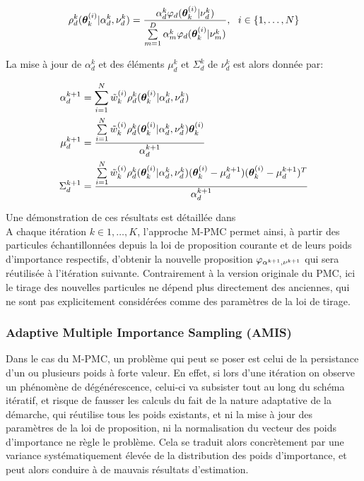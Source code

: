 \begin{equation}
	\rho_d^k({\bm{\theta}}_k^{(i)} | \alpha_d^k , \nu_d^k) = \dfrac{\alpha_d^k \varphi_d({\bm{\theta}}_k^{(i)} | \nu_d^k)}{\sum\limits_{m=1}^D\alpha_m^k \varphi_d({\bm{\theta}}_k^{(i)} | \nu_m^k)}, ~~ i \in \{1, \dots, N\}
\end{equation}

La mise à jour de $\alpha_d^k$ et des éléments $\mu_d^k$ et $\Sigma_d^k$ de $\nu_d^k$ est alors donnée par:

\begin{equation}
\begin{split}
\alpha_d^{k+1}  &= \sum\limits_{i=1}^N \tilde{w}_k^{(i)} \rho_d^k({\bm{\theta}}_k^{(i)} | \alpha_d^k , \nu_d^k) \\
\mu_d^{k+1} &= \dfrac{\sum\limits_{i=1}^N\tilde{w}_k^{(i)} \rho_d^k({\bm{\theta}}_k^{(i)} | \alpha_d^k , \nu_d^k) {\bm{\theta}}_k^{(i)}}{\alpha_d^{k+1} } \\
\Sigma_d^{k+1} &= \dfrac{\sum\limits_{i=1}^N \tilde{w}_k^{(i)} \rho_d^k({\bm{\theta}}_k^{(i)} | \alpha_d^k , \nu_d^k)({\bm{\theta}}_k^{(i)} - \mu_d^{k+1})({\bm{\theta}}_k^{(i)} - \mu_d^{k+1})^T }{\alpha_d^{k+1}}
\end{split}
\label{eq_maj_gaussien}
\end{equation}


Une démonstration de ces résultats est détaillée dans  \\


A chaque itération $k \in {1, \dots, K}$, l'approche M-PMC permet ainsi, à partir des particules échantillonnées depuis la loi de proposition courante et de leurs poids d'importance respectifs, d'obtenir la nouvelle proposition ${\varphi}_{\alpha^{k+1}, \nu^{k+1}}$ qui sera réutilisée à l'itération suivante. Contrairement à la version originale du PMC, ici le tirage des nouvelles particules ne dépend plus directement des anciennes, qui ne sont pas explicitement considérées comme des paramètres de la loi de tirage. \\

\subsubsection{Adaptive Multiple Importance Sampling (AMIS)}

Dans le cas du M-PMC, un problème qui peut se poser est celui de la persistance d'un ou plusieurs poids à forte valeur. En effet, si lors d'une itération on observe un phénomène de dégénérescence, celui-ci va subsister tout au long du schéma itératif, et risque de fausser les calculs du fait de la nature adaptative de la démarche, qui réutilise tous les poids existants, et ni la mise à jour des paramètres de la loi de proposition, ni la normalisation du vecteur des poids d'importance ne règle le problème. Cela se traduit alors concrètement par une variance systématiquement élevée de la distribution des poids d'importance, et peut alors conduire  à de mauvais résultats d'estimation. \\

